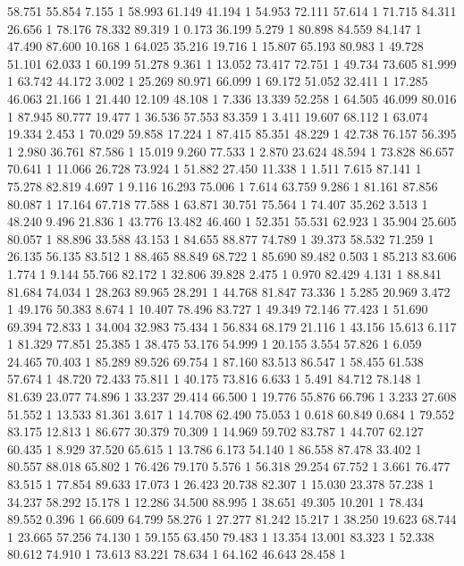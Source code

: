 	58.751	55.854	7.155	1
	58.993	61.149	41.194	1
	54.953	72.111	57.614	1
	71.715	84.311	26.656	1
	78.176	78.332	89.319	1
	0.173	36.199	5.279	1
	80.898	84.559	84.147	1
	47.490	87.600	10.168	1
	64.025	35.216	19.716	1
	15.807	65.193	80.983	1
	49.728	51.101	62.033	1
	60.199	51.278	9.361	1
	13.052	73.417	72.751	1
	49.734	73.605	81.999	1
	63.742	44.172	3.002	1
	25.269	80.971	66.099	1
	69.172	51.052	32.411	1
	17.285	46.063	21.166	1
	21.440	12.109	48.108	1
	7.336	13.339	52.258	1
	64.505	46.099	80.016	1
	87.945	80.777	19.477	1
	36.536	57.553	83.359	1
	3.411	19.607	68.112	1
	63.074	19.334	2.453	1
	70.029	59.858	17.224	1
	87.415	85.351	48.229	1
	42.738	76.157	56.395	1
	2.980	36.761	87.586	1
	15.019	9.260	77.533	1
	2.870	23.624	48.594	1
	73.828	86.657	70.641	1
	11.066	26.728	73.924	1
	51.882	27.450	11.338	1
	1.511	7.615	87.141	1
	75.278	82.819	4.697	1
	9.116	16.293	75.006	1
	7.614	63.759	9.286	1
	81.161	87.856	80.087	1
	17.164	67.718	77.588	1
	63.871	30.751	75.564	1
	74.407	35.262	3.513	1
	48.240	9.496	21.836	1
	43.776	13.482	46.460	1
	52.351	55.531	62.923	1
	35.904	25.605	80.057	1
	88.896	33.588	43.153	1
	84.655	88.877	74.789	1
	39.373	58.532	71.259	1
	26.135	56.135	83.512	1
	88.465	88.849	68.722	1
	85.690	89.482	0.503	1
	85.213	83.606	1.774	1
	9.144	55.766	82.172	1
	32.806	39.828	2.475	1
	0.970	82.429	4.131	1
	88.841	81.684	74.034	1
	28.263	89.965	28.291	1
	44.768	81.847	73.336	1
	5.285	20.969	3.472	1
	49.176	50.383	8.674	1
	10.407	78.496	83.727	1
	49.349	72.146	77.423	1
	51.690	69.394	72.833	1
	34.004	32.983	75.434	1
	56.834	68.179	21.116	1
	43.156	15.613	6.117	1
	81.329	77.851	25.385	1
	38.475	53.176	54.999	1
	20.155	3.554	57.826	1
	6.059	24.465	70.403	1
	85.289	89.526	69.754	1
	87.160	83.513	86.547	1
	58.455	61.538	57.674	1
	48.720	72.433	75.811	1
	40.175	73.816	6.633	1
	5.491	84.712	78.148	1
	81.639	23.077	74.896	1
	33.237	29.414	66.500	1
	19.776	55.876	66.796	1
	3.233	27.608	51.552	1
	13.533	81.361	3.617	1
	14.708	62.490	75.053	1
	0.618	60.849	0.684	1
	79.552	83.175	12.813	1
	86.677	30.379	70.309	1
	14.969	59.702	83.787	1
	44.707	62.127	60.435	1
	8.929	37.520	65.615	1
	13.786	6.173	54.140	1
	86.558	87.478	33.402	1
	80.557	88.018	65.802	1
	76.426	79.170	5.576	1
	56.318	29.254	67.752	1
	3.661	76.477	83.515	1
	77.854	89.633	17.073	1
	26.423	20.738	82.307	1
	15.030	23.378	57.238	1
	34.237	58.292	15.178	1
	12.286	34.500	88.995	1
	38.651	49.305	10.201	1
	78.434	89.552	0.396	1
	66.609	64.799	58.276	1
	27.277	81.242	15.217	1
	38.250	19.623	68.744	1
	23.665	57.256	74.130	1
	59.155	63.450	79.483	1
	13.354	13.001	83.323	1
	52.338	80.612	74.910	1
	73.613	83.221	78.634	1
	64.162	46.643	28.458	1
